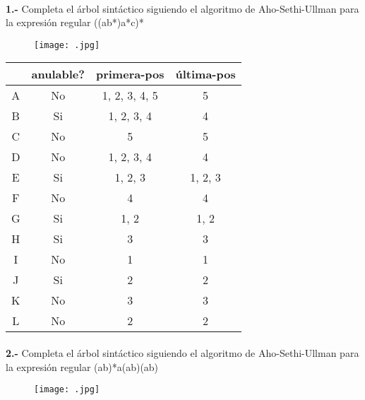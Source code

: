 \documentclass[11pt,a4paper]{report}
\begin{document}
\paragraph{}

\paragraph{}
\textbf{1.-} Completa el árbol sintáctico siguiendo el algoritmo de Aho-Sethi-Ullman para la expresión regular ((a\textbar b*)a*c)*
\begin{figure}[ht!]
\centering
\texttt{[image: .jpg]}
\end{figure}

\begin{tabular} {| c | c | c | c |}\hline
 & anulable? & primera-pos & última-pos\\ \hline
A & No & 1, 2, 3, 4, 5 & 5\\ \hline
B & Si & 1, 2, 3, 4 & 4\\ \hline
C & No & 5 & 5\\ \hline
D & No & 1, 2, 3, 4 & 4\\ \hline
E & Si & 1, 2, 3 & 1, 2, 3\\ \hline
F & No & 4 & 4\\ \hline
G & Si & 1, 2 & 1, 2\\ \hline
H & Si & 3 & 3\\ \hline
I & No & 1 & 1\\ \hline
J & Si & 2 & 2\\ \hline
K & No & 3 & 3\\ \hline
L & No & 2 & 2\\ \hline
\end{tabular}\paragraph{}
\textbf{2.-} Completa el árbol sintáctico siguiendo el algoritmo de Aho-Sethi-Ullman para la expresión regular (a\textbar b)*a(a\textbar b)(a\textbar b)
\begin{figure}[ht!]
\centering
\texttt{[image: .jpg]}
\end{figure}
\end{document}
